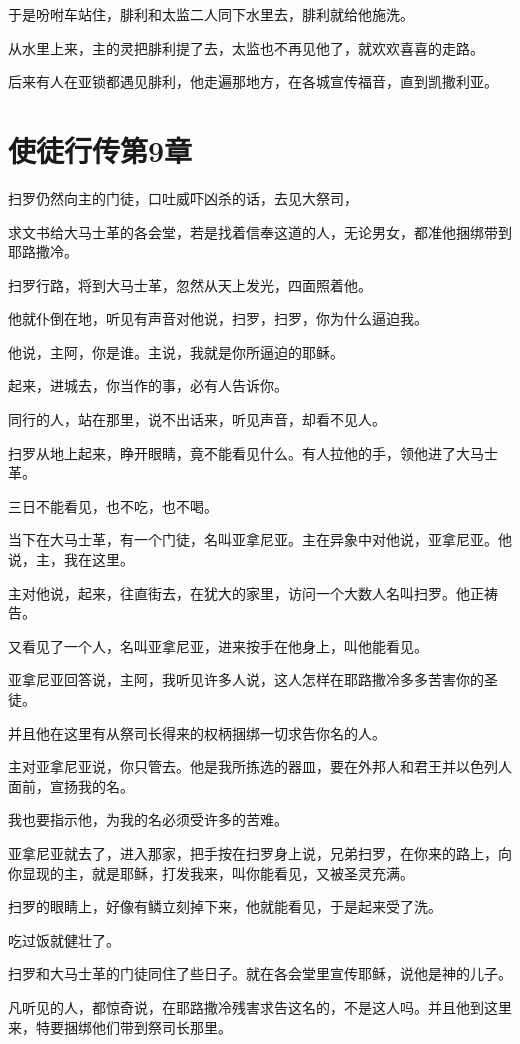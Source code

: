\documentclass[12pt,oneside]{book}
\begin{document}
于是吩咐车站住，腓利和太监二人同下水里去，腓利就给他施洗。

从水里上来，主的灵把腓利提了去，太监也不再见他了，就欢欢喜喜的走路。

后来有人在亚锁都遇见腓利，他走遍那地方，在各城宣传福音，直到凯撒利亚。

\chapter{使徒行传第9章}
扫罗仍然向主的门徒，口吐威吓凶杀的话，去见大祭司，

求文书给大马士革的各会堂，若是找着信奉这道的人，无论男女，都准他捆绑带到耶路撒冷。

扫罗行路，将到大马士革，忽然从天上发光，四面照着他。

他就仆倒在地，听见有声音对他说，扫罗，扫罗，你为什么逼迫我。

他说，主阿，你是谁。主说，我就是你所逼迫的耶稣。

起来，进城去，你当作的事，必有人告诉你。

同行的人，站在那里，说不出话来，听见声音，却看不见人。

扫罗从地上起来，睁开眼睛，竟不能看见什么。有人拉他的手，领他进了大马士革。

三日不能看见，也不吃，也不喝。

当下在大马士革，有一个门徒，名叫亚拿尼亚。主在异象中对他说，亚拿尼亚。他说，主，我在这里。

主对他说，起来，往直街去，在犹大的家里，访问一个大数人名叫扫罗。他正祷告。

又看见了一个人，名叫亚拿尼亚，进来按手在他身上，叫他能看见。

亚拿尼亚回答说，主阿，我听见许多人说，这人怎样在耶路撒冷多多苦害你的圣徒。

并且他在这里有从祭司长得来的权柄捆绑一切求告你名的人。

主对亚拿尼亚说，你只管去。他是我所拣选的器皿，要在外邦人和君王并以色列人面前，宣扬我的名。

我也要指示他，为我的名必须受许多的苦难。

亚拿尼亚就去了，进入那家，把手按在扫罗身上说，兄弟扫罗，在你来的路上，向你显现的主，就是耶稣，打发我来，叫你能看见，又被圣灵充满。

扫罗的眼睛上，好像有鳞立刻掉下来，他就能看见，于是起来受了洗。

吃过饭就健壮了。

扫罗和大马士革的门徒同住了些日子。就在各会堂里宣传耶稣，说他是神的儿子。

凡听见的人，都惊奇说，在耶路撒冷残害求告这名的，不是这人吗。并且他到这里来，特要捆绑他们带到祭司长那里。
\end{document}
